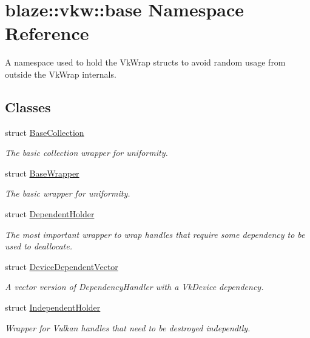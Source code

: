 \hypertarget{namespaceblaze_1_1vkw_1_1base}{}\section{blaze\+:\+:vkw\+:\+:base Namespace Reference}
\label{namespaceblaze_1_1vkw_1_1base}


A namespace used to hold the Vk\+Wrap structs to avoid random usage from outside the Vk\+Wrap internals.  


\subsection*{Classes}
\begin{DoxyCompactItemize}
\item 
struct \hyperlink{structblaze_1_1vkw_1_1base_1_1BaseCollection}{Base\+Collection}
\begin{DoxyCompactList}\small\item\em The basic collection wrapper for uniformity. \end{DoxyCompactList}\item 
struct \hyperlink{structblaze_1_1vkw_1_1base_1_1BaseWrapper}{Base\+Wrapper}
\begin{DoxyCompactList}\small\item\em The basic wrapper for uniformity. \end{DoxyCompactList}\item 
struct \hyperlink{structblaze_1_1vkw_1_1base_1_1DependentHolder}{Dependent\+Holder}
\begin{DoxyCompactList}\small\item\em The most important wrapper to wrap handles that require some dependency to be used to deallocate. \end{DoxyCompactList}\item 
struct \hyperlink{structblaze_1_1vkw_1_1base_1_1DeviceDependentVector}{Device\+Dependent\+Vector}
\begin{DoxyCompactList}\small\item\em A vector version of Dependency\+Handler with a Vk\+Device dependency. \end{DoxyCompactList}\item 
struct \hyperlink{structblaze_1_1vkw_1_1base_1_1IndependentHolder}{Independent\+Holder}
\begin{DoxyCompactList}\small\item\em Wrapper for Vulkan handles that need to be destroyed independtly. \end{DoxyCompactList}\end{DoxyCompactItemize}

